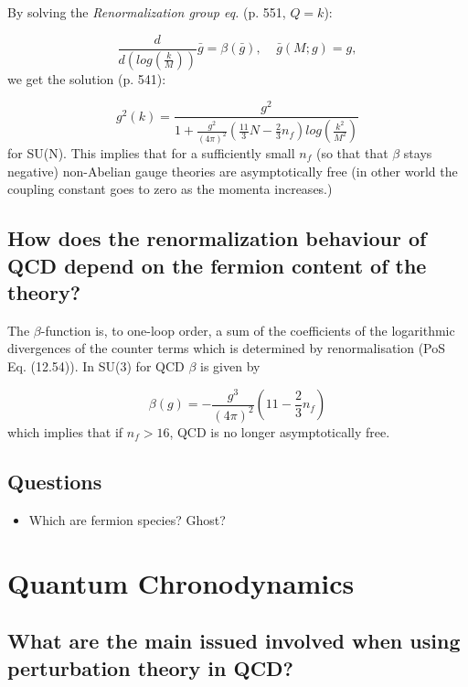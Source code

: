 \documentclass[paper=a4, fontsize=11pt]{scrartcl} %
\numberwithin{equation}{section} %
\numberwithin{figure}{section} %
\numberwithin{table}{section} %
\begin{document}
By solving the \textit{Renormalization group eq.} (p. 551, $Q=k$): 

\begin{equation}
\frac{d}{d(log(\frac{k}{M}))}\bar{g} = \beta(\bar{g}), \;\;\;\; \bar{g}(M;g) = g,
\end{equation}
we get the solution (p. 541):

\begin{equation}
g^2(k) = \frac{g^2}{1 + \frac{g^2}{(4\pi)^2} \left( \frac{11}{3}N - \frac{2}{3}n_f\right)log(\frac{k^2}{M^2}) }
\end{equation}
for SU(N). This implies that for a sufficiently small $n_f$ (so that that $\beta$ stays negative) non-Abelian gauge theories are asymptotically free (in other world the coupling constant goes to zero as the momenta increases.)


\subsection{How does the renormalization behaviour of QCD depend on the fermion content of the theory?}
The $\beta$-function is, to one-loop order, a sum of the coefficients of the logarithmic divergences of the counter terms which is determined by renormalisation (PoS Eq. (12.54)). In SU(3) for QCD $\beta$ is given by

\begin{equation}
\beta(g) = -\frac{g^3}{(4\pi)^2} \left( 11 - \frac{2}{3}n_f \right)
\end{equation}
which implies that if $n_{f}>16$, QCD is no longer asymptotically free. 


\subsection{Questions}
\begin{itemize}
\item Which are fermion species? Ghost?
\end{itemize}



\section{Quantum Chronodynamics}

\subsection{What are the main issued involved when using perturbation theory in QCD?}
\end{document}
